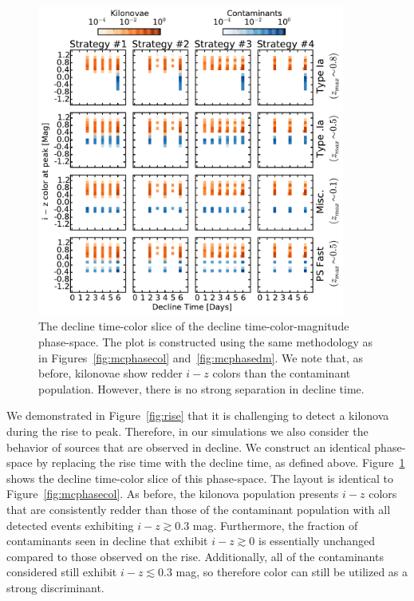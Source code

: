 \begin{figure}[t!]
\centering
\includegraphics[width=0.9\textwidth]{./figs/chapter2/ch2_f10.pdf}
\caption{The decline time-color slice of the decline time-color-magnitude phase-space. The plot is constructed using the same methodology as in Figures~\ref{fig:mcphasecol} and~\ref{fig:mcphasedm}. We note that, as before, kilonovae show redder $i-z$ colors than the contaminant population. However, there is no strong separation in decline time.}
\label{fig:deccol}
\end{figure}
   
We demonstrated in Figure~\ref{fig:rise} that it is challenging to detect a kilonova during the rise to peak. Therefore, in our simulations we also consider the behavior of sources that are observed in decline. We construct an identical phase-space by replacing the rise time with the decline time, as defined above. Figure~\ref{fig:deccol} shows the decline time-color slice of this phase-space. The layout is identical to Figure~\ref{fig:mcphasecol}. As before, the kilonova population presents $i-z$ colors that are consistently redder than those of the contaminant population with all detected events exhibiting $i-z \gtrsim 0.3$ mag. Furthermore, the fraction of contaminants seen in decline that exhibit $i-z\gtrsim0$ is essentially unchanged compared to those observed on the rise. Additionally, all of the contaminants considered still exhibit $i-z \lesssim 0.3$ mag, so therefore color can still be utilized as a strong discriminant. 
   
